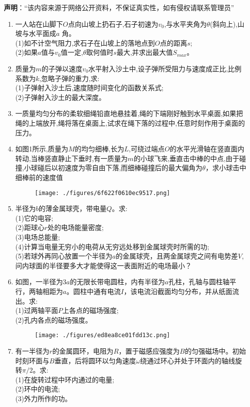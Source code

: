 


\textbf{声明}：“该内容来源于网络公开资料，不保证真实性，如有侵权请联系管理员” 


\begin{enumerate}
\item 一人站在山脚下$O$点向山坡上扔石子,石子初速为$v_0$,与水平夹角为$\theta$(斜向上),山坡与水平面成$a$ 角。\\
(1)如不计空气阻力,求石子在山坡上的落地点到$O$点的距离$s$;\\
(2)如果$a$值与$v_0$值一定,$\theta$取何值时$s$最大,并求出最大值$S_{max}$。
\item 质量为$m$的子弹以速度$v_0$水平射入沙土中,设子弹所受阻力与速度成正比,比例系数为$k$,忽略子弹的重力,求:\\
(1)子弹射入沙土后,速度随时间变化的函数关系式;\\
(2)子弹射入沙土的最大深度。
\item 一质量均匀分布的柔软细绳铅直地悬挂着,绳的下端刚好触到水平桌面,如果把绳的上端放开,绳将落在桌面上,试求在绳下落的过程中,任意时刻作用于桌面的压力。
\item 如图1所示,质量为$M$的均匀细棒,长为$L$,可绕过端点$O$的水平光滑轴在竖直面内转动,当棒竖直静止下垂时,有一质量为$m$的小球飞来,垂直击中棒的中点,由于碰撞,小球碰后以初速度为零自由下落,而细棒碰撞后的最大偏角为$\theta$，求小球击中细棒前的速度值
\begin{figure}[ht]
\centering
\texttt{[image: ./figures/6f622f0610ec9517.png]}
\caption{} \label{fig_SSD15_1}
\end{figure}
\item 半径为$b$的薄金属球壳，带电量$Q$。求:\\
(1)它的电容;\\
(2)距球心$r$处的电场能量密度;\\
(3)电场总能量;\\
(4)计算当电量无穷小的电荷从无穷远处移到金属球壳时所需的功;\\
(5)若球外再同心放置一个半径为$a$的金属球壳，且两金属球壳之间有电势差$V$,问内球面的半径要多大才能使得这一表面附近的电场最小？
\item 如图，一半径为$3a$的无限长带电圆柱，内有半径为$a$孔柱，孔轴与圆柱轴平行，两轴相距为$a$。圆柱中通有电流$I$，该电流沿截面均匀分布，并从纸面流出。求:\\
(1)过两轴平面$P$上各点的磁场强度;\\
(2)孔内各点的磁场强度。
\begin{figure}[ht]
\centering
\texttt{[image: ./figures/ed8ea8ce01fdd13c.png]}
\caption{} \label{fig_SSD15_2}
\end{figure}
\item 有一半径为$r$的金属圆环，电阻为$R$，置于磁感应强度为$B$的匀强磁场中。初始时刻环面与$B$垂直，后将圆环以匀角速度$\omega$绕通过环心并处于环面内的轴线旋转$\pi/2$。求:\\
(1)在旋转过程中环内通过的电量;\\
(2)环中的电流;\\
(3)外力所作的功。
\end{enumerate}